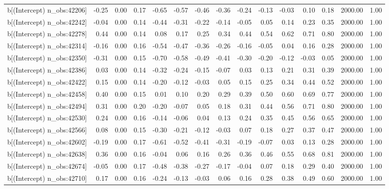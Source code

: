 \begin{table}[ht]
\begin{tabular}{rrrrrrrrrrrrrrr}
  b[(Intercept) n\_obs:42206] & -0.25 & 0.00 & 0.17 & -0.65 & -0.57 & -0.46 & -0.36 & -0.24 & -0.13 & -0.03 & 0.10 & 0.18 & 2000.00 & 1.00 \\ 
  b[(Intercept) n\_obs:42242] & -0.04 & 0.00 & 0.14 & -0.44 & -0.31 & -0.22 & -0.14 & -0.05 & 0.05 & 0.14 & 0.23 & 0.35 & 2000.00 & 1.00 \\ 
  b[(Intercept) n\_obs:42278] & 0.44 & 0.00 & 0.14 & 0.08 & 0.17 & 0.25 & 0.34 & 0.44 & 0.54 & 0.62 & 0.71 & 0.80 & 2000.00 & 1.00 \\ 
  b[(Intercept) n\_obs:42314] & -0.16 & 0.00 & 0.16 & -0.54 & -0.47 & -0.36 & -0.26 & -0.16 & -0.05 & 0.04 & 0.16 & 0.28 & 2000.00 & 1.00 \\ 
  b[(Intercept) n\_obs:42350] & -0.31 & 0.00 & 0.15 & -0.70 & -0.58 & -0.49 & -0.41 & -0.30 & -0.20 & -0.12 & -0.03 & 0.05 & 2000.00 & 1.00 \\ 
  b[(Intercept) n\_obs:42386] & 0.03 & 0.00 & 0.14 & -0.32 & -0.24 & -0.15 & -0.07 & 0.03 & 0.13 & 0.21 & 0.31 & 0.39 & 2000.00 & 1.00 \\ 
  b[(Intercept) n\_obs:42422] & 0.15 & 0.00 & 0.14 & -0.20 & -0.12 & -0.03 & 0.05 & 0.15 & 0.25 & 0.34 & 0.44 & 0.52 & 2000.00 & 1.00 \\ 
  b[(Intercept) n\_obs:42458] & 0.40 & 0.00 & 0.15 & 0.01 & 0.10 & 0.20 & 0.29 & 0.39 & 0.50 & 0.60 & 0.69 & 0.77 & 2000.00 & 1.00 \\ 
  b[(Intercept) n\_obs:42494] & 0.31 & 0.00 & 0.20 & -0.20 & -0.07 & 0.05 & 0.18 & 0.31 & 0.44 & 0.56 & 0.71 & 0.80 & 2000.00 & 1.00 \\ 
  b[(Intercept) n\_obs:42530] & 0.24 & 0.00 & 0.16 & -0.14 & -0.06 & 0.04 & 0.13 & 0.24 & 0.35 & 0.45 & 0.56 & 0.65 & 2000.00 & 1.00 \\ 
  b[(Intercept) n\_obs:42566] & 0.08 & 0.00 & 0.15 & -0.30 & -0.21 & -0.12 & -0.03 & 0.07 & 0.18 & 0.27 & 0.37 & 0.47 & 2000.00 & 1.00 \\ 
  b[(Intercept) n\_obs:42602] & -0.19 & 0.00 & 0.17 & -0.61 & -0.52 & -0.41 & -0.31 & -0.19 & -0.07 & 0.03 & 0.13 & 0.28 & 2000.00 & 1.00 \\ 
  b[(Intercept) n\_obs:42638] & 0.36 & 0.00 & 0.16 & -0.04 & 0.06 & 0.16 & 0.26 & 0.36 & 0.46 & 0.55 & 0.68 & 0.81 & 2000.00 & 1.00 \\ 
  b[(Intercept) n\_obs:42674] & -0.05 & 0.00 & 0.17 & -0.48 & -0.38 & -0.27 & -0.17 & -0.04 & 0.07 & 0.18 & 0.29 & 0.40 & 2000.00 & 1.00 \\ 
  b[(Intercept) n\_obs:42710] & 0.17 & 0.00 & 0.16 & -0.24 & -0.13 & -0.03 & 0.06 & 0.16 & 0.28 & 0.38 & 0.49 & 0.60 & 2000.00 & 1.00 \\ 

\end{tabular}
\end{table}
